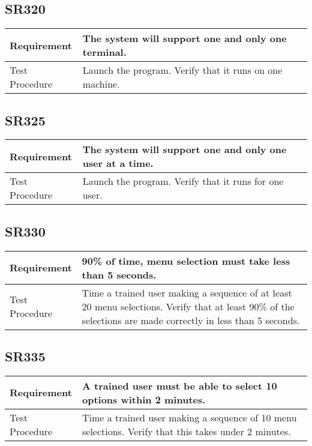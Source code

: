 \documentclass{article}
\begin{document}
\subsection{SR320}
\begin{tabular}{| l | p{12cm}  |}
    \hline
	Requirement & The system will support one and only one terminal. \\ \hline
	Test Procedure & Launch the program. Verify that it runs on one machine. \\ \hline
\end{tabular}
\subsection{SR325}
\begin{tabular}{| l | p{12cm}  |}
    \hline
	Requirement & The system will support one and only one user at a time. \\ \hline
	Test Procedure & Launch the program. Verify that it runs for one user. \\ \hline
\end{tabular}
\subsection{SR330}
\begin{tabular}{| l | p{12cm}  |}
    \hline
	Requirement & 90\% of time, menu selection must take less than 5 seconds. \\ \hline
	Test Procedure & Time a trained user making a sequence of at least 20 menu selections. Verify that at least 90\% of the selections are made correctly in less than 5 seconds. \\ \hline
\end{tabular}
\subsection{SR335}
\begin{tabular}{| l | p{12cm}  |}
    \hline
	Requirement & A trained user must be able to select 10 options within 2 minutes. \\ \hline
	Test Procedure & Time a trained user making a sequence of 10 menu selections. Verify that this takes under 2 minutes. \\ \hline
\end{tabular}
\end{document}
